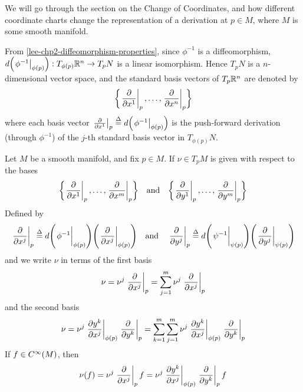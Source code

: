 \documentclass[../main-manifolds.tex]{subfiles}
\begin{document}
We will go through the section on the Change of Coordinates, and how different coordinate charts change the representation of a derivation at $p\in M$, where $M$ is some smooth  manifold.
\begin{definition}
    From \cref{lee-chp2-diffeomorphism-properties}, since $\phi^{-1}$ is a diffeomorphism, $d\qty(\eval{\phi^{-1}}_{\phi(p)}): T_{\phi(p)}\realn\to T_p N$ is a linear isomorphism. Hence $T_p N$ is a $n$-dimensional vector space, and the standard basis vectors of $T_p{\mathbb{R}^n}$ are denoted by
    \begin{equation}
        \bigset{\eval{\pdv{x^1}}_p,\ldots,\eval{\pdv{x^n}}_p}
    \end{equation}
    where each basis vector $\eval{\pdv{x^1}}_p\defined d\qty(\eval{\phi^{-1}}_{\phi(p)})$ is the push-forward derivation (through $\phi^{-1}$) of the $j$-th standard basis vector in $T_{\phi(p)}N$.
\end{definition}
\begin{wts}
    Let $M$ be a smooth manifold, and fix $p\in M$. If $\nu\in T_pM$ is given with respect to the bases
    \[
        \bigset{\eval{\pdv{x^1}}_{p},\ldots,\eval{\pdv{x^m}}_{p}}\qq{and}\bigset{\eval{\pdv{y^1}}_p,\ldots,\eval{\pdv{y^m}}_{p}}
    \]
    Defined by 
    \[\eval{\pdv{x^j}}_{p}\defined d\qty(\eval{\phi^{-1}}_{\phi(p)})\qty(\eval{\pdv{x^j}}_{\phi(p)})
    \qq{and}
    \eval{\pdv{y^j}}_{p}\defined d\qty(\eval{\psi^{-1}}_{\psi(p)})\qty(\eval{\pdv{y^j}}_{\psi(p)})\]
    and we write $\nu$ in terms of the first basis
    \[
        \nu = \nu^j\eval{\pdv{x^j}}_{p} = \sum_{j=1}^m \nu^j\eval{\pdv{x^j}}_{p}
    \]
    and the second basis
    \[
        \nu = \nu^j\eval{\pdv{y^k}{x^j}}_{\phi(p)}\eval{\pdv{y^k}}_{p} = \sum_{k=1}^m\sum_{j=1}^m \nu^j\eval{\pdv{y^k}{x^j}}_{\phi(p)}\eval{\pdv{y^k}}_p
    \]
    If $f\in \cinf[M]$, then 
    \[
        \nu(f) = \nu^j\eval{\pdv{x^j}}_{p} f =\nu^j\eval{\pdv{y^k}{x^j}}_{\phi(p)}\eval{\pdv{y^k}}_{p} f
    \]
\end{wts}
\end{document}
